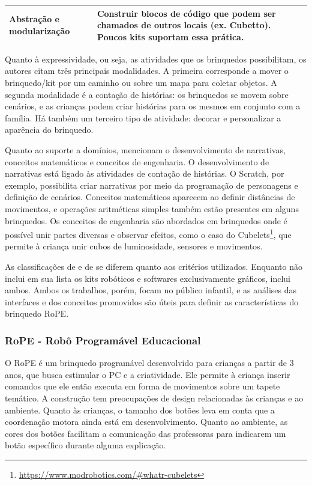 \begin{quadro}[!htbp]
\begin{center}
\begin{footnotesize}
\begin{tabular}{|p{3cm}|p{12cm}|}
    Abstração e modularização & Construir blocos de código que podem ser chamados de outros locais (ex. Cubetto). Poucos kits suportam essa prática. \\ \hline

\end{tabular}
 
 \end{footnotesize}
 \end{center}
\end{quadro}

Quanto à expressividade, ou seja, as atividades que os brinquedos possibilitam, os autores citam três principais modalidades. A primeira corresponde a mover o brinquedo/kit por um caminho ou sobre um mapa para coletar objetos. A segunda modalidade é a contação de histórias: os brinquedos se movem sobre cenários, e as crianças podem criar histórias para os mesmos em conjunto com a família. Há também um terceiro tipo de atividade: decorar e personalizar a aparência do brinquedo.

Quanto ao suporte a domínios,  mencionam o desenvolvimento de narrativas, conceitos matemáticos e conceitos de engenharia. O desenvolvimento de narrativas está ligado às atividades de contação de histórias. O Scratch, por exemplo, possibilita criar narrativas por meio da programação de personagens e definição de cenários. Conceitos matemáticos aparecem ao definir distâncias de movimentos, e operações aritméticas simples também estão presentes em alguns brinquedos. Os conceitos de engenharia são abordados em brinquedos onde é possível unir partes diversas e observar efeitos, como o caso do Cubelets\footnote{\url{https://www.modrobotics.com/\#whatr-cubelets}}, que permite à criança unir cubos de luminosidade, sensores e movimentos.

As classificações de  e de  se diferem quanto aos critérios utilizados. Enquanto  não inclui em sua lista os kits robóticos e softwares exclusivamente gráficos,  inclui ambos. Ambos os trabalhos, porém, focam no público infantil, e as análises das interfaces e dos conceitos promovidos são úteis para definir as características do brinquedo RoPE.

\subsubsection{RoPE - Robô Programável Educacional}
O RoPE é um brinquedo programável desenvolvido para crianças a partir de 3 anos, que busca estimular o \acl{PC} e a criatividade. Ele permite à criança inserir comandos que ele então executa em forma de movimentos sobre um tapete temático. A construção tem preocupações de design relacionadas às crianças e ao ambiente. Quanto às crianças, o tamanho dos botões leva em conta que a coordenação motora ainda está em desenvolvimento. Quanto ao ambiente, as cores dos botões facilitam a comunicação das professoras para indicarem um botão específico durante alguma explicação.

